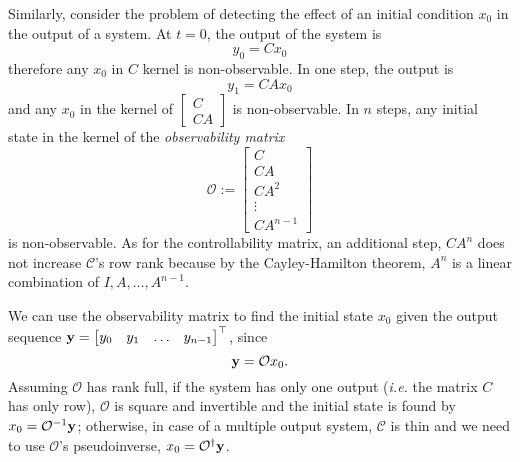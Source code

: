 Similarly, consider the problem of detecting the effect of an initial condition $x_0$ in the output of a system. At $t=0$, the output of the system is
\begin{equation*}
  y_0 = Cx_0
\end{equation*}
therefore any $x_0$ in $C$ kernel is non-observable. In one step, the output is
\begin{equation*}
  y_1 = CAx_0
\end{equation*}
and any $x_0$ in the kernel of $\begin{bmatrix} C \\ CA \end{bmatrix}$ is non-observable. In $n$ steps, any initial state in the kernel of the \emph{observability matrix}
\begin{equation}
  \label{eq:observability-matrix}
  \mathcal{O} :=
  \begin{bmatrix}
    C \\ CA \\ CA^2 \\ \vdots \\ CA^{n-1}
  \end{bmatrix}
\end{equation}
is non-observable. As for the controllability matrix, an additional step, $CA^n$ does not increase $\mathcal{C}$'s row rank because by the Cayley-Hamilton theorem, $A^n$ is a linear combination of $I, A,\ldots, A^{n-1}$.

We can use the observability matrix to find the initial state $x_0$ given the output sequence $\boldsymbol{\mathrm{y}} = \begin{bmatrix}
    y_0 & y_1 & \ldots & y_{n-1}
  \end{bmatrix}^\top$, since
\begin{equation*}
  \boldsymbol{\mathrm{y}} = \mathcal{O}x_0.
\end{equation*}
Assuming $\mathcal{O}$ has rank full, if the system has only one output (\textit{i.e.} the matrix $C$ has only row), $\mathcal{O}$ is square and invertible and the initial state is found by $x_0 = \mathcal{O}^{-1}\boldsymbol{\mathrm{y}}$; otherwise, in case of a multiple output system, $\mathcal{C}$ is thin and we need to use $\mathcal{O}$'s pseudoinverse, $x_0=\mathcal{O}^\dagger\boldsymbol{\mathrm{y}}$.

